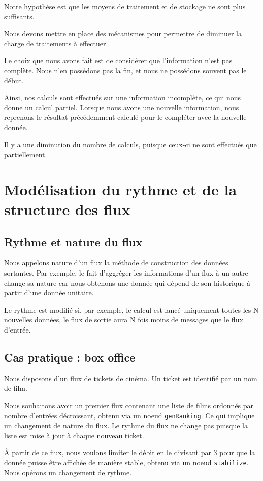 \documentclass{llncs}
\begin{document}
Notre hypothèse est que les moyens de traitement et de stockage ne sont plus
suffisants.

Nous devons mettre en place des mécanismes pour permettre de diminuer la charge
de traitements à effectuer.

Le choix que nous avons fait est de considérer que l'information n'est pas complète.
Nous n'en possédons pas la fin, et nous ne possédons souvent pas le début.

Ainsi, nos calculs sont effectués sur une information incomplète, ce qui nous
donne un calcul partiel.
Lorsque nous avons une nouvelle information, nous reprenons le résultat
précédemment calculé pour le compléter avec la nouvelle donnée.

Il y a une diminution du nombre de calculs, puisque ceux-ci ne sont effectués
que partiellement.

\section{Modélisation du rythme et de la structure des flux}
\subsection{Rythme et nature du flux}
Nous appelons nature d'un flux la méthode de construction des données sortantes.
Par exemple, le fait d'aggréger les informations d'un flux à un autre change
sa nature car nous obtenons une donnée qui dépend de son historique
à partir d'une donnée unitaire.

Le rythme est modifié si, par exemple, le calcul est lancé uniquement toutes les
N nouvelles données, le flux de sortie aura N fois moins de messages que le flux d'entrée.

\subsection{Cas pratique : box office}
Nous disposons d'un flux de tickets de cinéma.
Un ticket est identifié par un nom de film.

Nous souhaitons avoir un premier flux contenant une liste de films ordonnés par
nombre d'entrées décroissant, obtenu via un noeud \lstinline{genRanking}.
Ce qui implique un changement de nature du flux.
Le rythme du flux ne change pas puisque la liste est mise à jour à chaque nouveau
ticket.

À partir de ce flux, nous voulons limiter le débit en le divisant par 3 pour
que la donnée puisse être affichée de manière stable, obtenu via un noeud \lstinline{stabilize}.
Nous opérons un changement de rythme.
\end{document}
